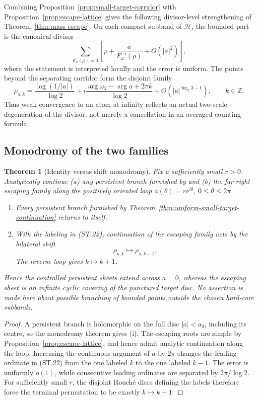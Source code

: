 \documentclass[11pt]{article}
\newtheorem{theorem}{Theorem}[section]
\theoremstyle{definition}
\theoremstyle{remark}
\begin{document}
Combining Proposition~\ref{prop:small-target-corridor} with
Proposition~\ref{prop:escape-lattice} gives the following divisor-level strengthening
of Theorem~\ref{thm:mass-escape}.  On each compact subband of $\mathcal H$, the bounded
part is the canonical divisor
\[
 \sum_{F_\omega(\rho)=0}
 \left[\rho+\frac{a}{F_\omega'(\rho)}+O(|a|^2)\right],
 \tag{ST.21}
\]
where the statement is interpreted locally and the error is uniform.  The points
beyond the separating corridor form the disjoint family
\[
 \rho_{a,k}
 =\frac{\log(1/|a|)}{\log2}
 +i\frac{\arg\omega_2-\arg a+2\pi k}{\log2}
 +O\!\left(|a|^{\log_2 3-1}\right),
 \qquad k\in\mathbb Z.
 \tag{ST.22}
\]
Thus weak convergence to an atom at infinity reflects an actual two-scale degeneration
of the divisor, not merely a cancellation in an averaged counting formula.

\subsection{Monodromy of the two families}

\begin{theorem}[Identity versus shift monodromy]
\label{thm:small-target-monodromy}
Fix a sufficiently small $r>0$.  Analytically continue (a) any persistent branch
furnished by  and (b) the far-right
escaping family along the positively oriented loop
$a(\theta)=re^{i\theta}$, $0\le\theta\le2\pi$.

\begin{enumerate}[label=\textup{(\roman*)}]
\item Every persistent branch furnished by
Theorem~\ref{thm:uniform-small-target-continuation} returns to itself.
\item With the labeling in (ST.22), continuation of the escaping family acts by the
bilateral shift
\[
 \boxed{\rho_{a,k}\longmapsto\rho_{a,k-1}.}
 \tag{ST.23}
\]
The reverse loop gives $k\mapsto k+1$.
\end{enumerate}
Hence the controlled persistent sheets extend across $a=0$, whereas the escaping
sheet is an infinite cyclic covering of the punctured target disc.  No assertion is
made here about possible branching of bounded points outside the chosen hard-core
subbands.
\end{theorem}

\begin{proof}
A persistent branch is holomorphic on the full disc $|a|<a_0$, including its centre,
so the monodromy theorem gives (i).  The escaping roots are simple by
Proposition~\ref{prop:escape-lattice}, and hence admit analytic continuation along the
loop.  Increasing the continuous argument of $a$ by $2\pi$ changes the leading
ordinate in (ST.22) from the one labeled $k$ to the one labeled $k-1$.  The error is
uniformly $o(1)$, while consecutive leading ordinates are separated by
$2\pi/\log2$.  For sufficiently small $r$, the disjoint Rouch\'e discs defining the
labels therefore force the terminal permutation to be exactly $k\mapsto k-1$.
\end{proof}
\end{document}
